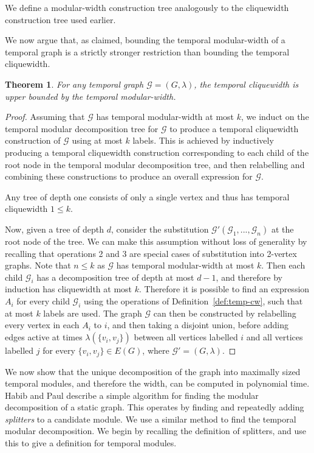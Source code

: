\documentclass[preprint,12pt]{elsarticle}
\newtheorem{theorem}{Theorem}
\begin{document}
We define a modular-width construction tree analogously to the cliquewidth construction tree used earlier.

We now argue that, as claimed, bounding the temporal modular-width of a temporal graph is a strictly stronger restriction than bounding the temporal cliquewidth.

\begin{theorem}
    For any temporal graph $\mathcal{G} = (G, \lambda)$, the temporal cliquewidth is upper bounded by the temporal modular-width.
\end{theorem}
\begin{proof}
    Assuming that $\mathcal{G}$ has temporal modular-width at most $k$, we induct on the temporal modular decomposition tree for $\mathcal{G}$ to produce a temporal cliquewidth construction of $\mathcal{G}$ using at most $k$ labels. This is achieved by inductively producing a temporal cliquewidth construction corresponding to each child of the root node in the temporal modular decomposition tree, and then relabelling and combining these constructions to produce an overall expression for $\mathcal{G}$.
    
    Any tree of depth one consists of only a single vertex and thus has temporal cliquewidth $1 \leq k$.

    Now, given a tree of depth $d$, consider the substitution $\mathcal{G'}(\mathcal{G}_1, ..., \mathcal{G}_n)$ at the root node of the tree. We can make this assumption without loss of generality by recalling that operations 2 and 3 are special cases of substitution into 2-vertex graphs. Note that $n \leq k$ as $\mathcal{G}$ has temporal modular-width at most $k$. Then each child $\mathcal{G}_i$ has a decomposition tree of depth at most $d-1$, and therefore by induction has cliquewidth at most $k$. Therefore it is possible to find an expression $A_i$ for every child $\mathcal{G}_i$ using the operations of Definition~\ref{def:temp-cw}, such that at most $k$ labels are used. 
    The graph $\mathcal{G}$ can then be constructed by relabelling every vertex in each $A_i$ to $i$, and then taking a disjoint union, before adding edges active at times $\lambda(\{v_i,v_j\})$ between all vertices labelled $i$ and all vertices labelled $j$ for every $\{v_i,v_j\}\in E(G)$, where $\mathcal{G}'=(G, \lambda)$.
\end{proof}

We now show that the unique decomposition of the graph into maximally sized temporal modules, and therefore the width, can be computed in polynomial time. Habib and Paul \cite{DBLP:journals/csr/HabibP10} describe a simple algorithm for finding the modular decomposition of a static graph. This operates by finding and repeatedly adding \textit{splitters} to a candidate module. We use a similar method to find the temporal modular decomposition. We begin by recalling the definition of splitters, and use this to give a definition for temporal modules.
\end{document}

